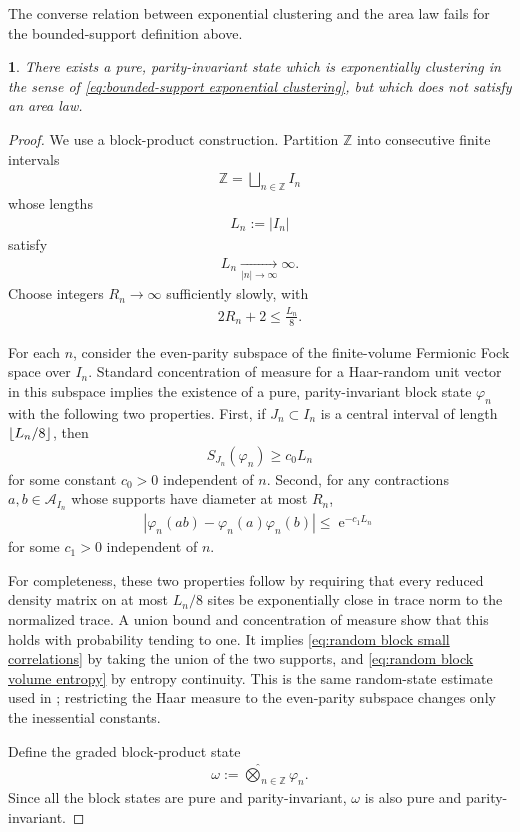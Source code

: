 \documentclass[a4paper,10pt]{article}
\numberwithin{equation}{section}
\theoremstyle{plain}
\theoremstyle{plain}
\theoremstyle{plain}
\theoremstyle{plain}
\theoremstyle{plain}
\newtheorem{claim}[claim]{\protect\claimname}
\theoremstyle{remark}
\theoremstyle{definition}
\providecommand{\claimname}{Claim}
\newcommand{\ee}{\operatorname{e}}
\newcommand{\ZZ}{\mathbb{Z}}
\newcommand{\calA}{\mathcal{A}}
\DeclarePairedDelimiter\floor{\lfloor}{\rfloor}
\newcommand{\eq}[1]{\begin{align*}#1\end{align*}}
\newcommand{\eql}[1]{\begin{align}#1\end{align}}
\begin{document}
The converse relation between exponential clustering and the area law
fails for the bounded-support definition above.

\begin{claim}
\label{claim:bounded support clustering does not imply area law}
There exists a pure, parity-invariant state which is exponentially
clustering in the sense of
\cref{eq:bounded-support exponential clustering}, but which does not
satisfy an area law.
\end{claim}

\begin{proof}
We use a block-product construction. Partition $\ZZ$ into consecutive
finite intervals
\eq{
    \ZZ
    =
    \bigsqcup_{n\in\ZZ}
    I_n
}
whose lengths
\eq{
    L_n
    :=
    |I_n|
}
satisfy
\eq{
    L_n
    \xrightarrow[|n|\to\infty]{}
    \infty.
}
Choose integers $R_n\to\infty$ sufficiently slowly, with
\eq{
    2R_n+2
    \leq
    \frac{L_n}{8}.
}

For each $n$, consider the even-parity subspace of the finite-volume
Fermionic Fock space over $I_n$. Standard concentration of measure for
a Haar-random unit vector in this subspace implies the existence of a
pure, parity-invariant block state $\varphi_n$ with the following two
properties. First, if $J_n\subset I_n$ is a central interval of length
$\floor{L_n/8}$, then
\eql{\label{eq:random block volume entropy}
    S_{J_n}(\varphi_n)
    \geq
    c_0L_n
}
for some constant $c_0>0$ independent of $n$. Second, for any
contractions $a,b\in\calA_{I_n}$ whose supports have diameter at most
$R_n$,
\eql{\label{eq:random block small correlations}
    \left|
        \varphi_n(ab)
        -
        \varphi_n(a)\varphi_n(b)
    \right|
    \leq
    \ee^{-c_1L_n}
}
for some $c_1>0$ independent of $n$.

For completeness, these two properties follow by requiring that every
reduced density matrix on at most $L_n/8$ sites be exponentially close
in trace norm to the normalized trace. A union bound and concentration
of measure show that this holds with probability tending to one. It
implies
\cref{eq:random block small correlations} by taking the union of the
two supports, and
\cref{eq:random block volume entropy} by entropy continuity. This is
the same random-state estimate used in
\cite[Appendix~D]{BrandaoHorodecki2015AreaLaw}; restricting the Haar
measure to the even-parity subspace changes only the inessential
constants.

Define the graded block-product state
\eql{\label{eq:random block product state}
    \omega
    :=
    \hat{\bigotimes}_{n\in\ZZ}
    \varphi_n.
}
Since all the block states are pure and parity-invariant, $\omega$ is
also pure and parity-invariant.


\end{proof}
\end{document}
